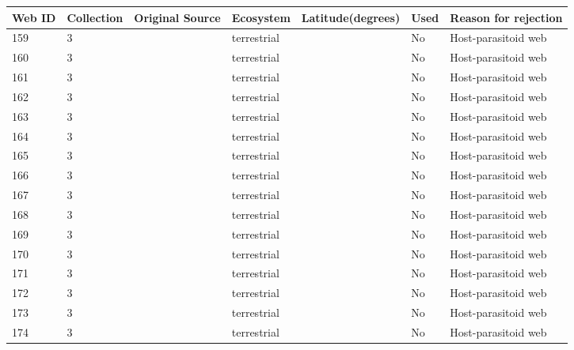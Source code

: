 \documentclass[12pt]{article}
\begin{document}
\begin{landscape}
        \newpage

    \begin{table}[h!]
    \centering
    {\footnotesize
      \begin{tabular}{p{2.8cm}p{1.3cm}p{3cm}p{2.2cm}p{2.5cm}lp{8.2cm}}
        \hline
        Web ID & Collection & Original Source & Ecosystem & Latitude(degrees) & Used  & Reason for rejection  \\
        \hline
        159   & 3 & \cite{Askew1961}     & terrestrial &       & No    & Host-parasitoid web \\
        160   & 3 & \cite{Askew1961}     & terrestrial &       & No    & Host-parasitoid web \\
        161   & 3 & \cite{Askew1961}     & terrestrial &       & No    & Host-parasitoid web \\
        162   & 3 & \cite{Askew1961}     & terrestrial &       & No    & Host-parasitoid web \\
        163   & 3 & \cite{Askew1961}     & terrestrial &       & No    & Host-parasitoid web \\
        164   & 3 & \cite{Askew1961}     & terrestrial &       & No    & Host-parasitoid web \\
        165   & 3 & \cite{Askew1961}     & terrestrial &       & No    & Host-parasitoid web \\
        166   & 3 & \cite{Askew1961}     & terrestrial &       & No    & Host-parasitoid web \\
        167   & 3 & \cite{Askew1961}     & terrestrial &       & No    & Host-parasitoid web \\
        168   & 3 & \cite{Hawkins1984}    & terrestrial &       & No    & Host-parasitoid web \\
        169   & 3 & \cite{Hawkins1984}    & terrestrial &       & No    & Host-parasitoid web \\        
        170   & 3 & \cite{Hawkins1984}    & terrestrial &       & No    & Host-parasitoid web \\
        171   & 3 & \cite{Hawkins1984}    & terrestrial &       & No    & Host-parasitoid web \\      
        172   & 3 & \cite{Hawkins1984}    & terrestrial &       & No    & Host-parasitoid web \\
        173   & 3 & \cite{Hawkins1984}    & terrestrial &       & No    & Host-parasitoid web \\
        174   & 3 & \cite{Hawkins1984}    & terrestrial &       & No    & Host-parasitoid web \\

\end{tabular}}
\end{table}
\end{landscape}
\end{document}

